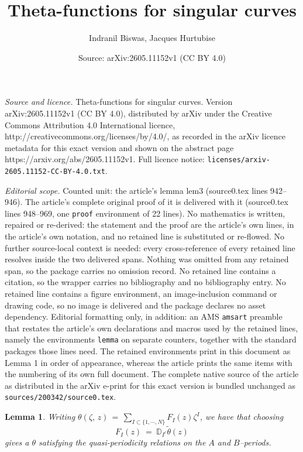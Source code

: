 \documentclass[10pt,a4paper]{amsart}
\title{Theta-functions for singular curves}
\author{Indranil Biswas, Jacques Hurtubise}
\date{Source: arXiv:2605.11152v1 (CC BY 4.0)}
\newtheorem{lemma}{Lemma}
\def\bD{{\mathbb {D}}}
\begin{document}
\maketitle

\noindent\emph{Source and licence.} Theta-functions for singular curves. Version arXiv:2605.11152v1 (CC BY 4.0), distributed by arXiv under the Creative Commons Attribution 4.0 International licence, http://creativecommons.org/licenses/by/4.0/, as recorded in the arXiv licence metadata for this exact version and shown on the abstract page https://arxiv.org/abs/2605.11152v1. Full licence notice: \texttt{licenses/arxiv-2605.11152-CC-BY-4.0.txt}.\par\smallskip

\noindent\textit{Editorial scope.} Counted unit: the article's lemma lem3 (source0.tex lines 942--946). The article's complete original proof of it is delivered with it (source0.tex lines 948--969, one \texttt{proof} environment of 22 lines). No mathematics is written, repaired or re-derived: the statement and the proof are the article's own lines, in the article's own notation, and no retained line is substituted or re-flowed.  No further source-local context is needed: every cross-reference of every retained line resolves inside the two delivered spans.  Nothing was omitted from any retained span, so the package carries no omission record.  No retained line contains a citation, so the wrapper carries no bibliography and no bibliography entry.  No retained line contains a figure environment, an image-inclusion command or drawing code, so no image is delivered and the package declares no asset dependency.  Editorial formatting only, in addition: an AMS \texttt{amsart} preamble that restates the article's own declarations and macros used by the retained lines, namely the environments \texttt{lemma} on separate counters, together with the standard packages those lines need.  The retained environments print in this document as Lemma 1 in order of appearance, whereas the article prints the same items with the numbering of its own full document.  The complete native source of the article as distributed in the arXiv e-print for this exact version is bundled unchanged as \texttt{sources/200342/source0.tex}.
\begin{lemma}\label{lem3}
Writing $\theta(\zeta,\, z) \,=\, \sum_{I\subset\{1,\cdots ,N\}} F_I(z) \zeta^I$, we have that choosing
$$F_I(z)\ = \  \bD_{I^c}\widetilde{\theta}(z)  $$
gives a $\theta$ satisfying the quasi-periodicity relations on the $A$ and $B$--periods.
\end{lemma}
\end{document}
